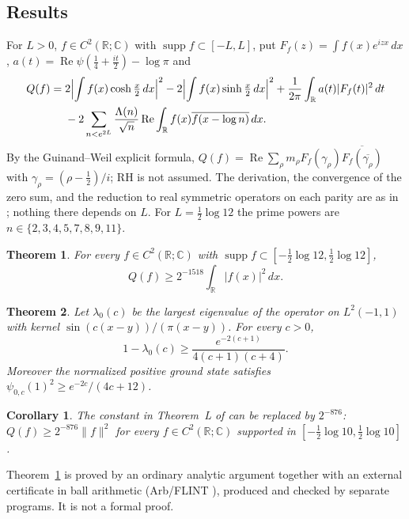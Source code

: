 \documentclass[11pt]{amsart}
\newtheorem{theorem}{Theorem}
\newtheorem{corollary}[proposition]{Corollary}
\theoremstyle{remark}
\numberwithin{equation}{section}
\newcommand{\R}{\mathbb{R}}
\newcommand{\C}{\mathbb{C}}
\begin{document}
\subsection{Results}
For $L>0$, $f\in C^2(\R;\C)$ with $\operatorname{supp}f\subset[-L,L]$, put $F_f(z)=\int f(x)e^{izx}\,dx$, $a(t)=\operatorname{Re}\psi(\tfrac14+\tfrac{it}2)-\log\pi$ and
\begin{equation}\label{eq:Q}
\begin{aligned}
Q(f)={}&2\Bigl|\int f(x)\cosh\tfrac x2\,dx\Bigr|^2-2\Bigl|\int f(x)\sinh\tfrac x2\,dx\Bigr|^2
+\frac1{2\pi}\int_\R a(t)|F_f(t)|^2\,dt\\
&-2\sum_{n<e^{2L}}\frac{\Lambda(n)}{\sqrt n}\operatorname{Re}\int_\R f(x)\overline{f(x-\log n)}\,dx .
\end{aligned}
\end{equation}
By the Guinand--Weil explicit formula, $Q(f)=\operatorname{Re}\sum_\rho m_\rho F_f(\gamma_\rho)\overline{F_f(\overline{\gamma_\rho})}$ with $\gamma_\rho=(\rho-\frac12)/i$; RH is not assumed. The derivation, the convergence of the zero sum, and the reduction to real symmetric operators on each parity are as in \cite[Section~2]{MoriVI}; nothing there depends on $L$. For $L=\frac12\log12$ the prime powers are $n\in\{2,3,4,5,7,8,9,11\}$.

\begin{theorem}\label{thm:M}
For every $f\in C^2(\R;\C)$ with $\operatorname{supp}f\subset[-\frac12\log12,\frac12\log12]$,
\[
Q(f)\ge2^{-1518}\int_\R|f(x)|^2\,dx .
\]
\end{theorem}

\begin{theorem}\label{thm:N}
Let $\lambda_0(c)$ be the largest eigenvalue of the operator on $L^2(-1,1)$ with kernel $\sin(c(x-y))/(\pi(x-y))$. For every $c>0$,
\[
1-\lambda_0(c)\ge\frac{e^{-2(c+1)}}{4(c+1)(c+4)} .
\]
Moreover the normalized positive ground state satisfies $\psi_{0,c}(1)^2\ge e^{-2c}/(4c+12)$.
\end{theorem}

\begin{corollary}\label{cor:mu10}
The constant in Theorem~L of \cite{MoriVI} can be replaced by $2^{-876}$: $Q(f)\ge2^{-876}\|f\|^2$ for every $f\in C^2(\R;\C)$ supported in $[-\frac12\log10,\frac12\log10]$.
\end{corollary}

Theorem~\ref{thm:M} is proved by an ordinary analytic argument together with an external certificate in ball arithmetic (Arb/FLINT \cite{Arb}), produced and checked by separate programs. It is not a formal proof.
\end{document}
